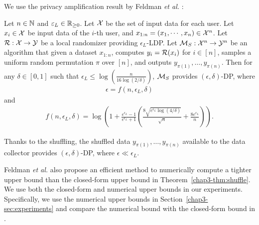 We use the privacy amplification result by Feldman \textit{et al.} \cite{Feldman_FOCS21}:
\begin{theorem}  \label{chap3-thm:shuffle}
Let $n \in \mathbb{N}$ and $\varepsilon_L \in \mathbb{R}_{\ge0}$. 
Let $\mathcal{X}$ be the set of input data for each user. 
Let $x_i \in \mathcal{X}$ be input data of the $i$-th user, and 
$x_{1:n} = (x_1, \cdots, x_n) \in \mathcal{X}^n$. 
Let $\mathcal{R}: \mathcal{X} \rightarrow \mathcal{Y}$ be a local randomizer providing $\epsilon_L$-LDP. 
Let $\mathcal{M}_S: \mathcal{X}^n \rightarrow \mathcal{Y}^n$ be an algorithm that given a dataset $x_{1:n}$, computes $y_i = \mathcal{R}(x_i)$ for $i \in [n]$, samples a uniform random permutation $\pi$ over $[n]$, and outputs $y_{\pi(1)}, \ldots, y_{\pi(n)}$. 
Then for any $\delta \in [0,1]$ such that $\epsilon_L \leq \log (\frac{n}{16 \log (2/\delta)})$, $\mathcal{M}_S$ provides $(\epsilon, \delta)$-DP, where
\begin{align}
\epsilon = f(n, \epsilon_L, \delta)
\label{chap3-eq:shuffle_epsilon_f}
\end{align}
and 
\begin{align}
f(n, \epsilon_L, \delta) = \log \left( 1 + \frac{e^{\epsilon_L}-1}{e^{\epsilon_L}+1} \left( \frac{8\sqrt{e^{\epsilon_L} \log(4/\delta)}}{\sqrt{n}} + \frac{8 e^{\epsilon_L}}{n} \right) \right).
\label{chap3-eq:shuffle_epsilon}
\end{align}
\end{theorem}
%   
Thanks to the shuffling, the shuffled data $y_{\pi(1)}, \ldots, y_{\pi(n)}$ available to the data collector provides $(\epsilon, \delta)$-DP, where $\epsilon \ll \epsilon_L$. 

Feldman \textit{et al.} \cite{Feldman_FOCS21} also propose an efficient method to numerically compute a tighter upper bound than the closed-form upper bound in Theorem~\ref{chap3-thm:shuffle}. 
We use both the closed-form and numerical upper bounds in our experiments. 
Specifically, we use the numerical upper bounds in Section~\ref{chap3-sec:experiments} and compare the numerical bound with the closed-form bound in 
. 

